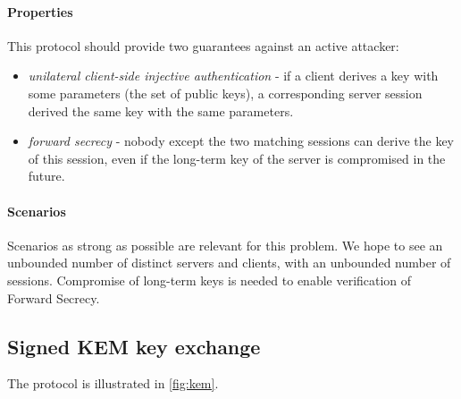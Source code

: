 \documentclass[11pt]{article}
\begin{document}
\paragraph{Properties} This protocol should provide two guarantees against an active attacker:
\begin{itemize}
\item \emph{unilateral client-side injective authentication} - if a client derives a key with some parameters (the set of public keys), a corresponding server session derived the same key with the same parameters.
\item \emph{forward secrecy} - nobody except the two matching sessions can derive the key of this session, even if the long-term key of the server is compromised in the future.
\end{itemize}

\paragraph{Scenarios} Scenarios as strong as possible are relevant for this problem. We hope to see an unbounded number of distinct servers and clients, with an unbounded number of sessions. Compromise of long-term keys is needed to enable verification of Forward Secrecy.  


\subsection{Signed KEM key exchange}\label{prob:kem}

The protocol is illustrated in \cref{fig:kem}.
\end{document}
